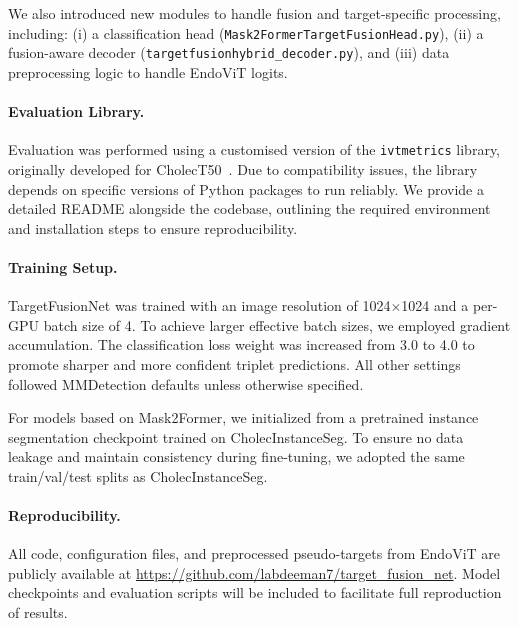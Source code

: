 \documentclass[11pt]{article}
\begin{document}
We also introduced new modules to handle fusion and target-specific processing, including: (i) a classification head (\texttt{Mask2FormerTargetFusionHead.py}), (ii) a fusion-aware decoder \newline (\texttt{targetfusionhybrid\_decoder.py}), and (iii) data preprocessing logic to handle EndoViT logits.

\paragraph{Evaluation Library.}
Evaluation was performed using a customised version of the \texttt{ivtmetrics} library, originally developed for CholecT50~\cite{nwoye2022rendezvous}. Due to compatibility issues, the library depends on specific versions of Python packages to run reliably. We provide a detailed README alongside the codebase, outlining the required environment and installation steps to ensure reproducibility.



\paragraph{Training Setup.}
TargetFusionNet was trained with an image resolution of 1024$\times$1024 and a per-GPU batch size of 4. To achieve larger effective batch sizes, we employed gradient accumulation. The classification loss weight was increased from 3.0 to 4.0 to promote sharper and more confident triplet predictions. All other settings followed MMDetection defaults unless otherwise specified.

For models based on Mask2Former, we initialized from a pretrained instance segmentation checkpoint trained on CholecInstanceSeg. To ensure no data leakage and maintain consistency during fine-tuning, we adopted the same train/val/test splits as CholecInstanceSeg.



\paragraph{Reproducibility.}
All code, configuration files, and preprocessed pseudo-targets from EndoViT are publicly available at \url{https://github.com/labdeeman7/target_fusion_net}.  Model checkpoints and evaluation scripts will be included to facilitate full reproduction of results.
\end{document}

